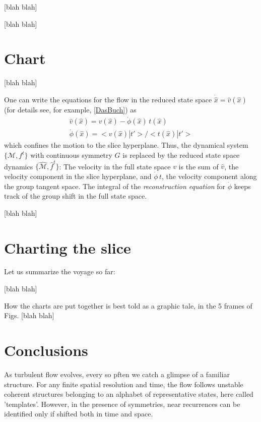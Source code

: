 \documentclass{article}
\begin{document}
 [blah blah]

 [blah blah]

\section{Chart}
\label{s:slice}

 [blah blah]

One can write the equations for the flow in the reduced state space
$\dot{\hat{x}} = \hat{v}(\hat{x})$ (for details see, for example,
\ref{DasBuch}) as
\begin{align}
\hat{v}(\hat{x}) = v(\hat{x})-\dot{\phi}(\hat{x}) \, t(\hat{x})
\label{2modesEqMotMFrame}\\
\dot{\phi}(\hat{x}) = <v(\hat{x})|t'>
                       /<t(\hat{x})|t'>
\label{2modesreconstrEq}
\end{align}
which confines the motion to the slice hyperplane. Thus, the dynamical
system $\{\mathcal{M},f^t\}$ with continuous symmetry $G$ is replaced by
the reduced state space dynamics $\{\hat{\mathcal{M}},\hat{f}^t\}$: The velocity in the
full state space $v$ is the sum of $\hat{v}$, the velocity component in
the slice hyperplane, and $\dot{\phi}\,t$, the velocity
component along the group tangent space. The integral of the {\em
reconstruction equation} for $\dot{\phi}$ keeps track of the group
shift in the full state space.


 [blah blah]

\section{Charting the slice}
\label{s:chart}

Let us summarize the voyage so far:

 [blah blah]


How the charts are put together is best told as a graphic tale, in the 5
frames of Figs.  [blah blah]



\section{Conclusions}
\label{s:concl}
As turbulent flow evolves, every so pften we catch a glimpse of a familiar structure. For any finite spatial resolution and time, the flow follows unstable coherent structures belonging to an alphabet of representative states, here called 'templates'. However, in the presence of symmetries, near recurrences can be identified only if shifted both in time and space.
\end{document}
